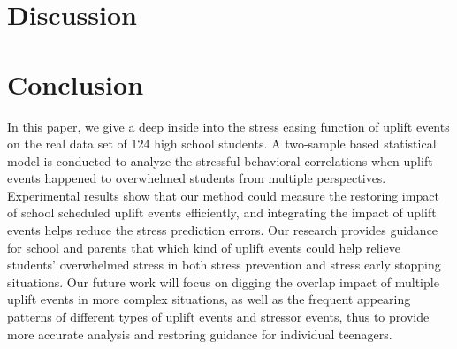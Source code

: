 \section{Discussion}
\section{Conclusion}
In this paper,
we give a deep inside into the stress easing function of uplift events on the real data set of 124 high school students.
A two-sample based statistical model is conducted to analyze the stressful behavioral correlations
when uplift events happened to overwhelmed students from multiple perspectives.
Experimental results show that our method could measure the restoring impact of school scheduled uplift events efficiently, and integrating the impact of uplift events helps reduce the stress prediction errors.
Our research provides guidance for school and parents that
which kind of uplift events could help relieve students' overwhelmed stress
in both stress prevention and stress early stopping situations.
Our future work will focus on digging the overlap impact of multiple uplift events in more complex situations, as well as the frequent appearing patterns of different types of uplift events and stressor events,
thus to provide more accurate analysis and restoring guidance for individual teenagers.
